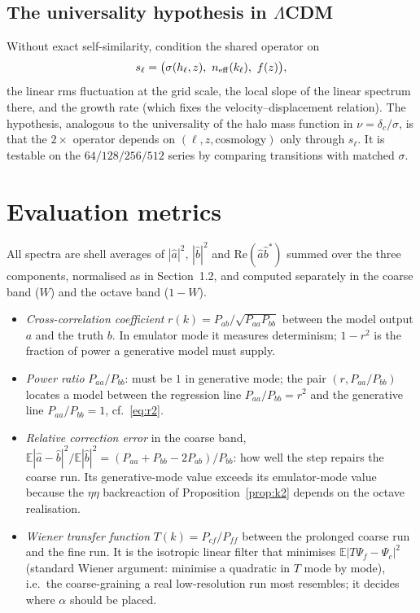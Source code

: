 \documentclass[11pt]{article}
\theoremstyle{definition}
\newcommand{\Psic}{\Psi_{c}}
\newcommand{\Psif}{\Psi_{f}}
\newcommand{\E}{\mathbb{E}}
\begin{document}
\subsection{The universality hypothesis in $\Lambda$CDM}

Without exact self-similarity, condition the shared operator on
\begin{equation}
s_\ell=\big(\sigma(h_\ell,z),\ n_{\rm eff}(k_\ell),\ f(z)\big),
\end{equation}
the linear rms fluctuation at the grid scale, the local slope of the linear spectrum there, and the growth rate (which fixes the velocity--displacement relation). The hypothesis, analogous to the universality of the halo mass function in $\nu=\delta_c/\sigma$, is that the $2\times$ operator depends on $(\ell,z,\text{cosmology})$ only through $s_\ell$. It is testable on the $64/128/256/512$ series by comparing transitions with matched $\sigma$.

\section{Evaluation metrics}

All spectra are shell averages of $|\hat a|^2$, $|\hat b|^2$ and $\mathrm{Re}(\hat a\hat b^*)$ summed over the three components, normalised as in Section~1.2, and computed separately in the coarse band ($W$) and the octave band ($1-W$).

\begin{itemize}
\item[] \emph{Cross-correlation coefficient} $r(k)=P_{ab}/\sqrt{P_{aa}P_{bb}}$ between the model output $a$ and the truth $b$. In emulator mode it measures determinism; $1-r^2$ is the fraction of power a generative model must supply.
\item[] \emph{Power ratio} $P_{aa}/P_{bb}$: must be $1$ in generative mode; the pair $(r,P_{aa}/P_{bb})$ locates a model between the regression line $P_{aa}/P_{bb}=r^2$ and the generative line $P_{aa}/P_{bb}=1$, cf.\ \eqref{eq:r2}.
\item[] \emph{Relative correction error} in the coarse band, $\E|\hat a-\hat b|^2/\E|\hat b|^2=(P_{aa}+P_{bb}-2P_{ab})/P_{bb}$: how well the step repairs the coarse run. Its generative-mode value exceeds its emulator-mode value because the $\eta\eta$ backreaction of Proposition~\ref{prop:k2} depends on the octave realisation.
\item[] \emph{Wiener transfer function} $T(k)=P_{cf}/P_{ff}$ between the prolonged coarse run and the fine run. It is the isotropic linear filter that minimises $\E|T\Psif-\Psic|^2$ (standard Wiener argument: minimise a quadratic in $T$ mode by mode), i.e.\ the coarse-graining a real low-resolution run most resembles; it decides where $\alpha$ should be placed.
\end{itemize}
\end{document}
